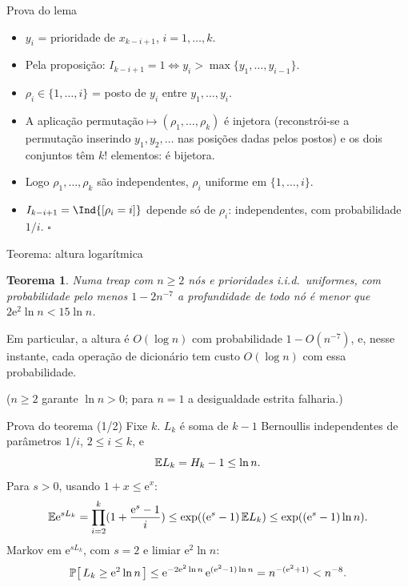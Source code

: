 \documentclass[aspectratio=169,11pt]{beamer}
\newtheorem{teorema}{Teorema}
\theoremstyle{definition}
\begin{document}
\begin{frame}{Prova do lema}
  \begin{itemize}
  \item $y_i$ = prioridade de $x_{k-i+1}$, $i=1,\dots,k$.
  \item Pela proposição: $I_{k-i+1}=1\iff y_i>\max\{y_1,\dots,y_{i-1}\}$.
  \pause
  \item $\rho_i\in\{1,\dots,i\}$ = posto de $y_i$ entre $y_1,\dots,y_i$.
  \item A aplicação
    $\text{permutação}\mapsto(\rho_1,\dots,\rho_k)$ é injetora
    (reconstrói-se a permutação inserindo $y_1,y_2,\dots$ nas posições
    dadas pelos postos) e os dois conjuntos têm $k!$ elementos:
    é bijetora.
  \pause
  \item Logo $\rho_1,\dots,\rho_k$ são independentes, $\rho_i$ uniforme
    em $\{1,\dots,i\}$.
  \item $I_{k-i+1}=\Ind{[\rho_i=i]}$ depende só de $\rho_i$:
    independentes, com probabilidade $1/i$. \hfill $\square$
  \end{itemize}
\end{frame}

\begin{frame}{Teorema: altura logarítmica}
  \begin{teorema}
    Numa treap com $n\ge2$ nós e prioridades i.i.d.\ uniformes, com
    probabilidade pelo menos $1-2n^{-7}$ a profundidade de todo nó é
    menor que $2\mathrm e^2\ln n<15\ln n$.
  \end{teorema}
  \pause
  Em particular, a altura é $O(\log n)$ com probabilidade
  $1-O(n^{-7})$, e, nesse instante, cada operação de dicionário tem
  custo $O(\log n)$ com essa probabilidade.

  \medskip
  \small
  ($n\ge2$ garante $\ln n>0$; para $n=1$ a desigualdade estrita
  falharia.)
\end{frame}

\begin{frame}{Prova do teorema (1/2)}
  Fixe $k$. $L_k$ é soma de $k-1$ Bernoullis independentes de
  parâmetros $1/i$, $2\le i\le k$, e
  \[
    \mathbb{E}{L_k}=H_k-1\le\ln n .
  \]
  \pause
  Para $s>0$, usando $1+x\le\mathrm e^x$:
  \[
    \mathbb{E}{\mathrm e^{sL_k}}
    =\prod_{i=2}^{k}\lparen1+\frac{\mathrm e^s-1}{i}\rparen
    \le\exp\lparen(\mathrm e^s-1)\,\mathbb{E}{L_k}\rparen
    \le\exp\lparen(\mathrm e^s-1)\ln n\rparen.
  \]
  \pause
  Markov em $\mathrm e^{sL_k}$, com $s=2$ e limiar $\mathrm e^2\ln n$:
  \[
    \ProbE{L_k\ge\mathrm e^2\ln n}
    \le\mathrm e^{-2\mathrm e^2\ln n}\,\mathrm e^{(\mathrm e^2-1)\ln n}
    =n^{-(\mathrm e^2+1)}<n^{-8}.
  \]
\end{frame}
\end{document}

